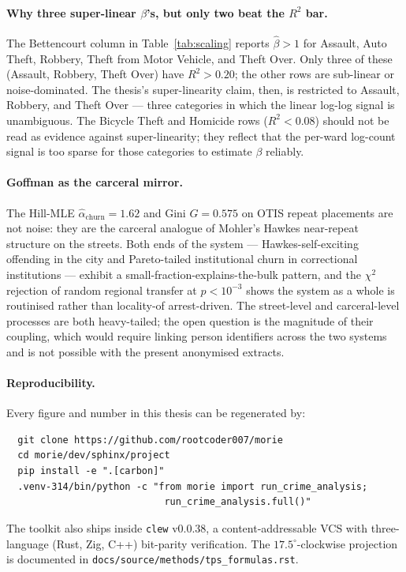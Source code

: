 \documentclass[11pt,a4paper]{article}
\newcommand{\1}{\mathbf{1}}
\theoremstyle{plain}
\theoremstyle{definition}
\begin{document}
\paragraph{Why three super-linear $\beta$'s, but only two beat the
$R^2$ bar.}  The Bettencourt column in
Table~\ref{tab:scaling} reports $\hat\beta>1$ for Assault, Auto
Theft, Robbery, Theft from Motor Vehicle, and Theft Over.  Only
three of these (Assault, Robbery, Theft Over) have $R^2 > 0.20$;
the other rows are sub-linear or noise-dominated.  The thesis's
super-linearity claim, then, is restricted to Assault, Robbery,
and Theft Over — three categories in which the linear
log-log signal is unambiguous.  The Bicycle Theft and Homicide
rows ($R^2 < 0.08$) should not be read as evidence against
super-linearity; they reflect that the per-ward log-count signal
is too sparse for those categories to estimate $\beta$ reliably.

\paragraph{Goffman as the carceral mirror.}  The Hill-MLE
$\hat\alpha_{\text{churn}} = 1.62$ and Gini $G=0.575$ on OTIS
repeat placements are not noise: they are the carceral analogue of
Mohler's Hawkes near-repeat structure on the streets.  Both ends
of the system — Hawkes-self-exciting offending in the city and
Pareto-tailed institutional churn in correctional institutions —
exhibit a small-fraction-explains-the-bulk pattern, and the
$\chi^2$ rejection of random regional transfer at $p<10^{-3}$
shows the system as a whole is routinised rather than locality-of
arrest-driven.  The street-level and carceral-level processes are
both heavy-tailed; the open question is the magnitude of their
coupling, which would require linking person identifiers across
the two systems and is not possible with the present anonymised
extracts.

\paragraph{Reproducibility.}  Every figure and number in this
thesis can be regenerated by:
\begin{verbatim}
  git clone https://github.com/rootcoder007/morie
  cd morie/dev/sphinx/project
  pip install -e ".[carbon]"
  .venv-314/bin/python -c "from morie import run_crime_analysis;
                            run_crime_analysis.full()"
\end{verbatim}
The toolkit also ships inside \texttt{clew} v0.0.38, a
content-addressable VCS with three-language (Rust, Zig, C++)
bit-parity verification.  The $17.5^\circ$-clockwise projection is
documented in \texttt{docs/source/methods/tps\_formulas.rst}.
\end{document}
